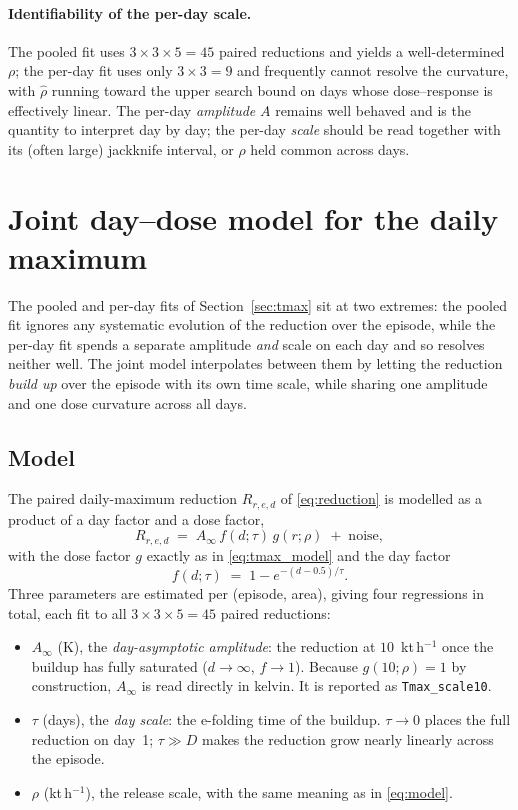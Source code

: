 \documentclass[11pt]{article}
\begin{document}
\paragraph{Identifiability of the per-day scale.} The pooled fit uses
$3\times3\times5 = 45$ paired reductions and yields a well-determined $\rho$; the
per-day fit uses only $3\times3 = 9$ and frequently cannot resolve the curvature,
with $\widehat{\rho}$ running toward the upper search bound on days whose
dose--response is effectively linear. The per-day \emph{amplitude} $A$ remains
well behaved and is the quantity to interpret day by day; the per-day \emph{scale}
should be read together with its (often large) jackknife interval, or $\rho$ held
common across days.

\section{Joint day--dose model for the daily maximum}

The pooled and per-day fits of Section~\ref{sec:tmax} sit at two extremes: the
pooled fit ignores any systematic evolution of the reduction over the episode,
while the per-day fit spends a separate amplitude \emph{and} scale on each day and
so resolves neither well. The joint model interpolates between them by letting the
reduction \emph{build up} over the episode with its own time scale, while sharing
one amplitude and one dose curvature across all days.

\subsection{Model}

The paired daily-maximum reduction $R_{r,e,d}$ of \eqref{eq:reduction} is modelled
as a product of a day factor and a dose factor,
\begin{equation}
  R_{r,e,d} \;=\; A_\infty\, f(d;\tau)\, g(r;\rho) \;+\; \text{noise},
  \label{eq:daydose}
\end{equation}
with the dose factor $g$ exactly as in \eqref{eq:tmax_model} and the day factor
\begin{equation}
  f(d;\tau) \;=\; 1 - e^{-(d-0.5)/\tau}.
  \label{eq:dayterm}
\end{equation}
Three parameters are estimated per (episode, area), giving four regressions in
total, each fit to all $3\times3\times5=45$ paired reductions:
\begin{itemize}
  \item $A_\infty$ (K), the \emph{day-asymptotic amplitude}: the reduction at
        $10$~kt\,h$^{-1}$ once the buildup has fully saturated ($d\to\infty$,
        $f\to1$). Because $g(10;\rho)=1$ by construction, $A_\infty$ is read
        directly in kelvin. It is reported as \texttt{Tmax\_scale10}.
  \item $\tau$ (days), the \emph{day scale}: the e-folding time of the buildup.
        $\tau\to0$ places the full reduction on day~1; $\tau\gg D$ makes the
        reduction grow nearly linearly across the episode.
  \item $\rho$ (kt\,h$^{-1}$), the release scale, with the same meaning as in
        \eqref{eq:model}.
\end{itemize}
\end{document}
